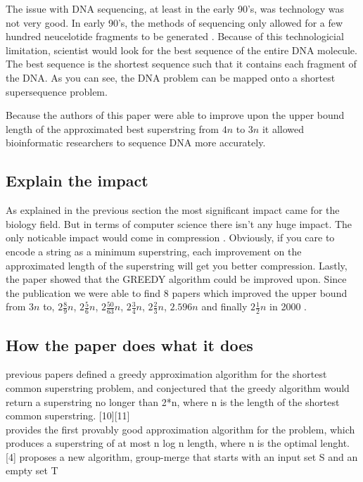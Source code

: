 \documentclass[letterpaper,twocolumn,11pt]{article}
\begin{document}
The issue with DNA sequencing, at least in the early 90's, was technology was not very good. In early 90's, the methods of sequencing only allowed for a few hundred neucelotide fragments to be generated \cite{karp1993mapping}. Because of this technologicial limitation, scientist would look for the best sequence of the entire DNA molecule. The best sequence is the shortest sequence such that it contains each fragment of the DNA. As you can see, the DNA problem can be mapped onto a shortest supersequence problem. 

Because the authors of this paper were able to improve upon the upper bound length of the approximated best superstring from $4n$ to $3n$ it allowed bioinformatic researchers to sequence DNA more accurately. 



\subsection*{Explain the impact}
As explained in the previous section the most significant impact came for the biology field. But in terms of computer science there isn't any huge impact. The only noticable impact would come in compression \cite{storer1988data}. Obviously, if you care to encode a string as a minimum superstring, each improvement on the approximated length of the superstring will get you better compression. Lastly, the paper showed that the GREEDY algorithm could be improved upon. Since the publication we were able to find 8 papers which improved the upper bound from $3n$ to, $2 \frac{8}{9}n$, $2 \frac{5}{6}n$, $2 \frac{50}{63}n$, $2 \frac{3}{4}n$, $2 \frac{2}{3}n$, $2.596n$ and finally $2 \frac{1}{2}n$ in 2000 \cite{sweedyk2000boldmath}.



\subsection*{How the paper does what it does}

previous papers defined a greedy approximation algorithm for the shortest common superstring
problem, and conjectured that the greedy algorithm would return a superstring no longer than 
2*n, where n is the length of the shortest common superstring.  [10][11]
\\
[4] provides the first provably good approximation algorithm for the problem, which produces
a superstring of at most n log n length, where n is the optimal lenght.
[4] proposes a new algorithm, group-merge that starts with
an input set S and an empty set T
\end{document}
